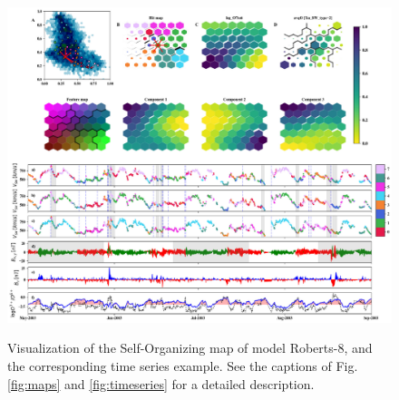 \documentclass[utf8]{frontiersSCNS} %
\begin{document}
\begin{figure}[h!]
	\includegraphics[width=18cm]{modelR}\\%
	\caption{Visualization of the Self-Organizing map of model Roberts-8, and the corresponding time series example. See the captions of Fig.\ref{fig:maps}  and \ref{fig:timeseries} for a detailed description.}\label{fig:modelR}
\end{figure}
\end{document}
